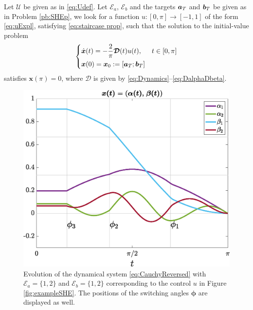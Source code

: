 \documentclass[twocolumn]{autart}    %
\begin{document}
\medskip

\begin{problem}\label{pb:SHEpControl}
Let $\mathcal{U}$ be given as in \eqref{eq:Udef}. Let $\mathcal{E}_a$, $\mathcal{E}_b$ and the targets $\bm{a}_T$ and $\bm{b}_T$ be given as in Problem \ref{pb:SHEp},  we look for a function $u: [0,\pi]\to [-1,1]$ of the form \eqref{eq:uExpl}, satisfying \eqref{eq:staircase prop}, such that the solution to the initial-value problem
\begin{equation}\label{eq:CauchyReversed}
	\begin{cases}
        \displaystyle\dot{\bm{x}}(t) = -\frac 2\pi\bm{\mathcal{D}}(t)u(t),  & t \in [0,\pi]
        \\[5pt]
        \bm{x}(0) = \bm{x}_0 := [\bm{a}_T; \bm{b}_T]
    \end{cases}
\end{equation}
satisfies $\bm{x} (\pi) = 0$, where $\bm{\mathcal{D}}$ is given by \eqref{eq:Dynamics}--\eqref{eq:DalphaDbeta}.
\end{problem}

\begin{figure}[ht!] 
    \centering
    \includegraphics[scale=0.325]{img/fig02.eps}
    \caption{Evolution of the dynamical system \eqref{eq:CauchyReversed} with $\mathcal{E}_a = \{1,2\}$ and $\mathcal{E}_b = \{1,2\}$ corresponding to the control $u$ in Figure \ref{fig:exampleSHE}. The positions of the switching angles $\bm{\phi}$ are displayed as well.}\label{fig:evolution_x}
\end{figure}
\end{document}
